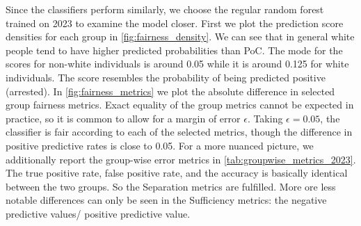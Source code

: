 Since the classifiers perform similarly, we choose the regular random forest trained on 2023 to examine the model closer.
First we plot the prediction score densities for each group in \autoref{fig:fairness_density}. We can see that in general white people tend to have higher predicted probabilities than PoC. The mode for the scores for non-white individuals is around 0.05 while it is around 0.125 for white individuals. The score resembles the probability of being predicted positive (arrested).
In \autoref{fig:fairness_metrics} we plot the absolute difference in selected group fairness metrics.
Exact equality of the group metrics cannot be expected in practice, so it is common to allow for a margin of error $\epsilon$. Taking $\epsilon = 0.05$, the classifier is fair according to each of the selected metrics, though the difference in positive predictive rates is close to 0.05.
For a more nuanced picture, we additionally report the group-wise error metrics in \autoref{tab:groupwise_metrics_2023}.
The true positive rate, false positive rate, and the accuracy is basically identical between the two groups. So the Separation metrics are fulfilled. More ore less notable differences can only be seen in the Sufficiency metrics: the negative predictive values/ positive predictive value.\\

